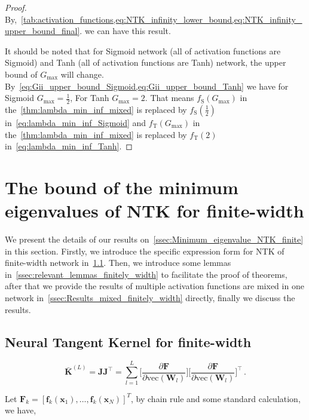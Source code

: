 \documentclass[nohyperref]{article}
\theoremstyle{plain}
\theoremstyle{definition}
\theoremstyle{remark}
\begin{document}
\begin{proof}

By,~\cref{tab:activation_functions,eq:NTK_infinity_lower_bound,eq:NTK_infinity_upper_bound_final}. we can have this result.

It should be noted that for Sigmoid network (all of activation functions are Sigmoid) and Tanh (all of activation functions are Tanh) network, the upper bound of $G_{\max}$ will change. By~\cref{eq:Gii_upper_bound_Sigmoid,eq:Gii_upper_bound_Tanh} we have for Sigmoid $G_{\max} = \frac{1}{2}$, For Tanh $G_{\max} = 2$. That means $f_{\mathrm{S}}(G_{\max})$ in the~\cref{thm:lambda_min_inf_mixed} is replaced by $f_{\mathrm{S}}(\frac{1}{2})$ in~\cref{eq:lambda_min_inf_Sigmoid} and $f_{\mathrm{T}}(G_{\max})$ in the~\cref{thm:lambda_min_inf_mixed} is replaced by $f_{\mathrm{T}}(2)$ in~\cref{eq:lambda_min_inf_Tanh}.

\end{proof}




\section{The bound of the minimum eigenvalues of NTK for finite-width}
\label{sec:finitely_width}

We present the details of our results on~\cref{ssec:Minimum_eigenvalue_NTK_finite} in this section. Firstly, we introduce the specific expression form for NTK of finite-width network in~\cref{sec:NTK_finite_width}. Then, we introduce some lemmas in~\cref{ssec:relevant_lemmas_finitely_width} to facilitate the proof of theorems, after that we provide the results of multiple activation functions are mixed in one network in~\cref{ssec:Results_mixed_finitely_width} directly, finally we discuss the results.

\subsection{Neural Tangent Kernel for finite-width}
\label{sec:NTK_finite_width}

\begin{equation*}
\bar{\bm{K}}^{(L)}=\bm{JJ}^{\top}=\sum_{l=1}^{L}\bigg[\frac{\partial \bm{F}}{\partial \mathrm{vec}(\bm{W}_l)}\bigg]\bigg[\frac{\partial \bm{F}}{\partial \mathrm{vec}(\bm{W}_l)}\bigg]^{\top}\,.
\end{equation*}

Let $\bm{F}_k=[\bm{f}_k(\bm{x}_1) ,\ldots,\bm{f}_k(\bm{x}_N)]^T$, by chain rule and some standard calculation, we have,
\end{document}
